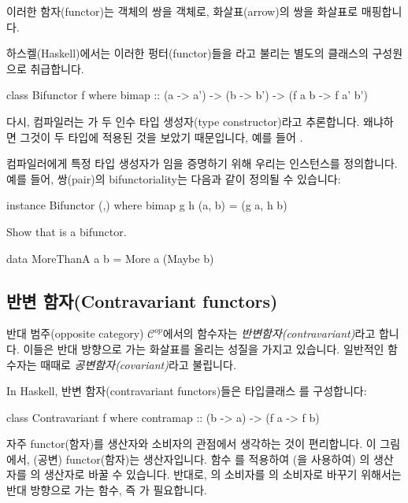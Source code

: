 \documentclass[DaoFP]{subfiles}
\begin{document}
이러한 함자(functor)는 객체의 쌍을 객체로, 화살표(arrow)의 쌍을 화살표로 매핑합니다.

하스켈(Haskell)에서는 이러한 펑터(functor)들을 라고 불리는 별도의 클래스의 구성원으로 취급합니다.

\begin{haskell}
class Bifunctor f where
  bimap :: (a -> a') -> (b -> b') -> (f a b -> f a' b')
\end{haskell}
다시, 컴파일러는 가 두 인수 타입 생성자(type constructor)라고 추론합니다. 왜냐하면 그것이 두 타입에 적용된 것을 보았기 때문입니다, 예를 들어 .

컴파일러에게 특정 타입 생성자가 임을 증명하기 위해 우리는 인스턴스를 정의합니다. 예를 들어, 쌍(pair)의 bifunctoriality는 다음과 같이 정의될 수 있습니다:
\begin{haskell}
instance Bifunctor (,) where
  bimap g h (a, b) = (g a, h b)
\end{haskell}

\begin{exercise}
Show that  is a bifunctor.
\begin{haskell}
data MoreThanA a b = More a (Maybe b)
\end{haskell}
\end{exercise}


\subsection{반변 함자(Contravariant functors)}

반대 범주(opposite category) $\mathcal{C}^{op}$에서의 함수자는 \emph{반변함자(contravariant)}라고 합니다. 이들은 반대 방향으로 가는 화살표를 올리는 성질을 가지고 있습니다. 일반적인 함수자는 때때로 \emph{공변함자(covariant)}라고 불립니다.

In Haskell, 반변 함자(contravariant functors)들은 타입클래스 를 구성합니다:
\begin{haskell}
class Contravariant f where
  contramap :: (b -> a) -> (f a -> f b)
\end{haskell}

자주 functor(함자)를 생산자와 소비자의 관점에서 생각하는 것이 편리합니다. 이 그림에서, (공변) functor(함자)는 생산자입니다. 함수 를 적용하여 (을 사용하여) 의 생산자를 의 생산자로 바꿀 수 있습니다. 반대로, 의 소비자를 의 소비자로 바꾸기 위해서는 반대 방향으로 가는 함수, 즉 가 필요합니다.
\end{document}
